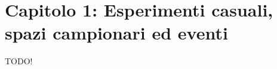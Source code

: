 \section{Capitolo 1: Esperimenti casuali, spazi campionari ed eventi}
\begin{flushleft}
TODO!
\end{flushleft}
